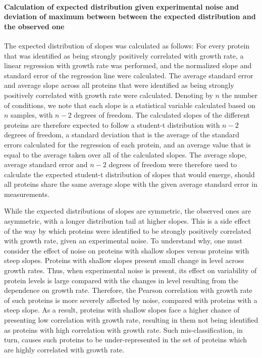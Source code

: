 \documentclass[10pt,letterpaper]{article}
\date{}
\begin{document}
\paragraph{Calculation of expected distribution given experimental noise and deviation of maximum between between the expected distribution and the observed one}
The expected distribution of slopes was calculated as follows:
For every protein that was identified as being strongly positively correlated with growth rate, a linear regression with growth rate was performed, and the normalized slope and standard error of the regression line were calculated.
The average standard error and average slope across all proteins that were identified as being strongly positively correlated with growth rate were calculated.
Denoting by $n$ the number of conditions, we note that each slope is a statistical variable calculated based on $n$ samples, with $n-2$ degrees of freedom.
The calculated slopes of the different proteins are therefore expected to follow a student-t distribution with $n-2$ degrees of freedom, a standard deviation that is the average of the standard errors calculated for the regression of each protein, and an average value that is equal to the average taken over all of the calculated slopes.
The average slope, average standard error and $n-2$ degrees of freedom were therefore used to calculate the expected student-t distribution of slopes that would emerge, should all proteins share the same average slope with the given average standard error in measurements.

While the expected distributions of slopes are symmetric, the observed ones are asymmetric, with a longer distribution tail at higher slopes.
This is a side effect of the way by which proteins were identified to be strongly positively correlated with growth rate, given an experimental noise.
To understand why, one must consider the effect of noise on proteins with shallow slopes versus proteins with steep slopes.
Proteins with shallow slopes present small change in level across growth rates.
Thus, when experimental noise is present, its effect on variability of protein levels is large compared with the changes in level resulting from the dependence on growth rate.
Therefore, the Pearson correlation with growth rate of such proteins is more severely affected by noise, compared with proteins with a steep slope.
As a result, proteins with shallow slopes face a higher chance of presenting low correlation with growth rate, resulting in them not being identified as proteins with high correlation with growth rate.
Such mis-classification, in turn, causes such proteins to be under-represented in the set of proteins which are highly correlated with growth rate.
\end{document}
